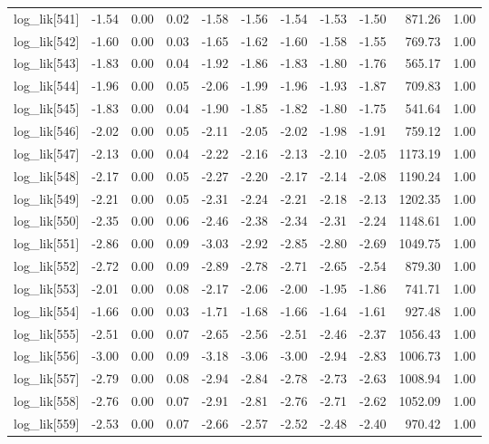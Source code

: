 \begin{table}[ht]
\begin{tabular}{rrrrrrrrrrr}
  log\_lik[541] & -1.54 & 0.00 & 0.02 & -1.58 & -1.56 & -1.54 & -1.53 & -1.50 & 871.26 & 1.00 \\ 
  log\_lik[542] & -1.60 & 0.00 & 0.03 & -1.65 & -1.62 & -1.60 & -1.58 & -1.55 & 769.73 & 1.00 \\ 
  log\_lik[543] & -1.83 & 0.00 & 0.04 & -1.92 & -1.86 & -1.83 & -1.80 & -1.76 & 565.17 & 1.00 \\ 
  log\_lik[544] & -1.96 & 0.00 & 0.05 & -2.06 & -1.99 & -1.96 & -1.93 & -1.87 & 709.83 & 1.00 \\ 
  log\_lik[545] & -1.83 & 0.00 & 0.04 & -1.90 & -1.85 & -1.82 & -1.80 & -1.75 & 541.64 & 1.00 \\ 
  log\_lik[546] & -2.02 & 0.00 & 0.05 & -2.11 & -2.05 & -2.02 & -1.98 & -1.91 & 759.12 & 1.00 \\ 
  log\_lik[547] & -2.13 & 0.00 & 0.04 & -2.22 & -2.16 & -2.13 & -2.10 & -2.05 & 1173.19 & 1.00 \\ 
  log\_lik[548] & -2.17 & 0.00 & 0.05 & -2.27 & -2.20 & -2.17 & -2.14 & -2.08 & 1190.24 & 1.00 \\ 
  log\_lik[549] & -2.21 & 0.00 & 0.05 & -2.31 & -2.24 & -2.21 & -2.18 & -2.13 & 1202.35 & 1.00 \\ 
  log\_lik[550] & -2.35 & 0.00 & 0.06 & -2.46 & -2.38 & -2.34 & -2.31 & -2.24 & 1148.61 & 1.00 \\ 
  log\_lik[551] & -2.86 & 0.00 & 0.09 & -3.03 & -2.92 & -2.85 & -2.80 & -2.69 & 1049.75 & 1.00 \\ 
  log\_lik[552] & -2.72 & 0.00 & 0.09 & -2.89 & -2.78 & -2.71 & -2.65 & -2.54 & 879.30 & 1.00 \\ 
  log\_lik[553] & -2.01 & 0.00 & 0.08 & -2.17 & -2.06 & -2.00 & -1.95 & -1.86 & 741.71 & 1.00 \\ 
  log\_lik[554] & -1.66 & 0.00 & 0.03 & -1.71 & -1.68 & -1.66 & -1.64 & -1.61 & 927.48 & 1.00 \\ 
  log\_lik[555] & -2.51 & 0.00 & 0.07 & -2.65 & -2.56 & -2.51 & -2.46 & -2.37 & 1056.43 & 1.00 \\ 
  log\_lik[556] & -3.00 & 0.00 & 0.09 & -3.18 & -3.06 & -3.00 & -2.94 & -2.83 & 1006.73 & 1.00 \\ 
  log\_lik[557] & -2.79 & 0.00 & 0.08 & -2.94 & -2.84 & -2.78 & -2.73 & -2.63 & 1008.94 & 1.00 \\ 
  log\_lik[558] & -2.76 & 0.00 & 0.07 & -2.91 & -2.81 & -2.76 & -2.71 & -2.62 & 1052.09 & 1.00 \\ 
  log\_lik[559] & -2.53 & 0.00 & 0.07 & -2.66 & -2.57 & -2.52 & -2.48 & -2.40 & 970.42 & 1.00 \\ 

\end{tabular}
\end{table}
